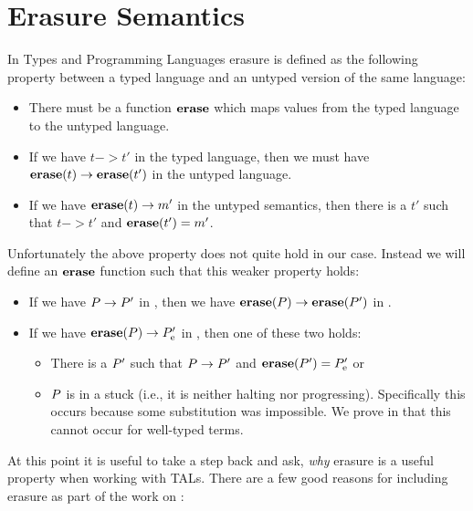 \chapter{Erasure Semantics}
\label{chap:erasure}

In Types and Programming Languages\cite{typesandprog} erasure is defined as the following
property between a typed language and an untyped version of the same language:

\begin{itemize}
\item There must be a function ${\mathbf{erase}}$ which maps values from the typed
  language to the untyped language.
\item If we have $t -> t'$ in the typed language, then we must have
  ${\mathbf{erase}}(t) -> {\mathbf{erase}}(t')$ in the untyped language.
\item If we have ${\mathbf{erase}}(t) -> m'$ in the untyped semantics, then there is a
  $t'$ such that $t -> t'$ and ${\mathbf{erase}}(t') = m'$.
\end{itemize}

Unfortunately the above property does not quite hold in our case. Instead we
will define an ${\mathbf{erase}}$ function such that this weaker property holds:

\begin{itemize}
\item If we have ${P} -> {P'}$ in \ATAL, then we have
  ${{\mathbf{erase}}(P)} -> {{\mathbf{erase}}(P')}$ in \ATALe.
\item If we have ${{\mathbf{erase}}(P)} -> {P'_{\mathrm{e}}}$ in \ATALe, then one of
  these two holds:
  \begin{itemize}
  \item There is a $P'$ such that ${P} -> {P'}$ and
    ${\mathbf{erase}}(P') = P'_{\mathrm{e}}$ or
  \item $P$ is in a stuck (i.e., it is neither halting nor
    progressing). Specifically this occurs because some substitution was
    impossible. We prove in  that this cannot occur for
    well-typed terms.
  \end{itemize}
\end{itemize}

At this point it is useful to take a step back and ask, \emph{why} erasure is a
useful property when working with TALs. There are a few good reasons for
including erasure as part of the work on \ATAL:

